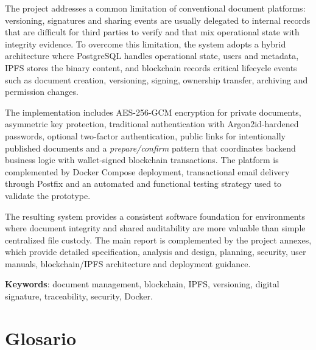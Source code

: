 \documentclass[11pt, a4paper]{article}
\begin{document}
The project addresses a common limitation of conventional document platforms: versioning, signatures and sharing events are usually delegated to internal records that are difficult for third parties to verify and that mix operational state with integrity evidence. To overcome this limitation, the system adopts a hybrid architecture where PostgreSQL handles operational state, users and metadata, IPFS stores the binary content, and blockchain records critical lifecycle events such as document creation, versioning, signing, ownership transfer, archiving and permission changes.

The implementation includes AES-256-GCM encryption for private documents, asymmetric key protection, traditional authentication with Argon2id-hardened passwords, optional two-factor authentication, public links for intentionally published documents and a \textit{prepare/confirm} pattern that coordinates backend business logic with wallet-signed blockchain transactions. The platform is complemented by Docker Compose deployment, transactional email delivery through Postfix and an automated and functional testing strategy used to validate the prototype.

The resulting system provides a consistent software foundation for environments where document integrity and shared auditability are more valuable than simple centralized file custody. The main report is complemented by the project annexes, which provide detailed specification, analysis and design, planning, security, user manuals, blockchain/IPFS architecture and deployment guidance.

\textbf{Keywords}: document management, blockchain, IPFS, versioning, digital signature, traceability, security, Docker.

\section*{Glosario}
\end{document}
